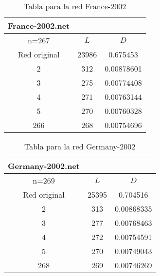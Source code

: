 \begin{minipage}{0.5\textwidth}
  \begin{table}[H]
    \caption{Tabla para la red France-2002}
    \begin{tabular}{ccc}
    France-2002.net & & \\
      \hline
      n=267             & $L$ &  $D$  \\
      \hline
      Red original &               23986 & 0.675453   \\
      2            &                 312 & 0.00878601 \\
      3            &                 275 & 0.00774408 \\
      4            &                 271 & 0.00763144 \\
      5            &                 270 & 0.00760328 \\
      266          &                 268 & 0.00754696 \\
      \hline
    \end{tabular}
    \label{fr02}
  \end{table}
\end{minipage}
\begin{minipage}{0.5\textwidth}
  \begin{table}[H]
    \caption{Tabla para la red Germany-2002}
    \begin{tabular}{ccc}
      Germany-2002.net & & \\
      \hline
      n=269              &   $L$ &   $D$ \\
      \hline
      Red original &               25395 & 0.704516   \\
      2            &                 313 & 0.00868335 \\
      3            &                 277 & 0.00768463 \\
      4            &                 272 & 0.00754591 \\
      5            &                 270 & 0.00749043 \\
      268          &                 269 & 0.00746269 \\
      \hline
    \end{tabular}  
  \end{table}
  \label{ger}
\end{minipage}
